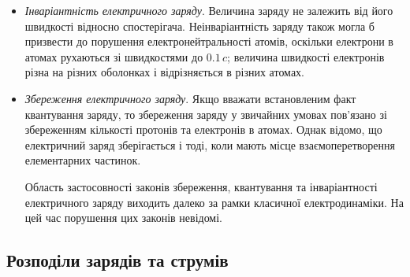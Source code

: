 \begin{itemize}
	      Слід відзначити, що сучасні експерименти дають змогу вивчати розподіл заряду всередині елементарних частинок. Але наявність неперервного розподілу густини заряду всередині, наприклад, протона чи нейтрона, яка досліджується при зіткненнях елементарних частинок, не суперечить квантуванню електричного заряду. Ця властивість стосується повного заряду частинок, що можуть існувати ізольовано від інших. З іншого боку, на даний момент немає даних, які свідчили б про існування структури електрона. У сучасній теорії він є точковою безструктурною частинкою.


	\item \textit{Інваріантність електричного заряду}. Величина заряду не залежить від його
	      швидкості відносно спостерігача. Неінваріантність заряду також могла б призвести до порушення
	      електронейтральності атомів, оскільки електрони в атомах рухаються зі швидкостями до $0.1\,c$; величина
	      швидкості електронів різна на різних оболонках і відрізняється в різних атомах.



	\item \textit{Збереження електричного заряду}. Якщо вважати встановленим факт
	      квантування заряду, то збереження заряду у звичайних умовах пов'язано зі збереженням кількості протонів та
	      електронів в атомах. Однак відомо, що електричний заряд зберігається і тоді, коли
	      мають місце взаємоперетворення елементарних частинок.


	      Область застосовності законів збереження, квантування та інваріантності електричного заряду виходить далеко за
	      рамки класичної електродинаміки. На цей час порушення цих законів невідомі.

\end{itemize}

\subsection*{Розподіли зарядів та струмів}

